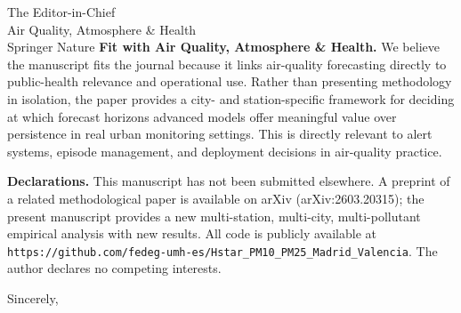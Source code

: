 \documentclass[12pt, a4paper]{letter}
\begin{document}
\begin{letter}{The Editor-in-Chief\\
               Air Quality, Atmosphere \& Health\\
               Springer Nature}
\textbf{Fit with Air Quality, Atmosphere \& Health.}
We believe the manuscript fits the journal because it links air-quality
forecasting directly to public-health relevance and operational use.
Rather than presenting methodology in isolation, the paper provides a
city- and station-specific framework for deciding at which forecast
horizons advanced models offer meaningful value over persistence in
real urban monitoring settings. This is directly relevant to alert
systems, episode management, and deployment decisions in air-quality
practice.

\textbf{Declarations.}
This manuscript has not been submitted elsewhere. A preprint of a
related methodological paper is available on arXiv
(arXiv:2603.20315); the present manuscript provides a new
multi-station, multi-city, multi-pollutant empirical analysis with new
results. All code is publicly available at\\
\texttt{https://github.com/fedeg-umh-es/Hstar\_PM10\_PM25\_Madrid\_Valencia}.
The author declares no competing interests.

\closing{Sincerely,}

\end{letter}
\end{document}
